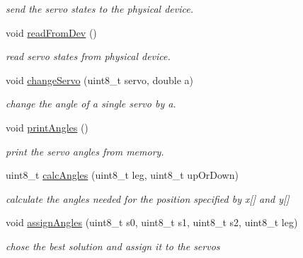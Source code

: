 \begin{DoxyCompactItemize}
\begin{DoxyCompactList}\small\item\em send the servo states to the physical device. \item\end{DoxyCompactList}\item 
\hypertarget{class_c_q_ped_aac05763481aaef8e97cb1491bfca4334}{
void \hyperlink{class_c_q_ped_aac05763481aaef8e97cb1491bfca4334}{readFromDev} ()}
\label{class_c_q_ped_aac05763481aaef8e97cb1491bfca4334}

\begin{DoxyCompactList}\small\item\em read servo states from physical device. \item\end{DoxyCompactList}\item 
\hypertarget{class_c_q_ped_a1164619231de4b603e81a9667dd70426}{
void \hyperlink{class_c_q_ped_a1164619231de4b603e81a9667dd70426}{changeServo} (uint8\_\-t servo, double a)}
\label{class_c_q_ped_a1164619231de4b603e81a9667dd70426}

\begin{DoxyCompactList}\small\item\em change the angle of a single servo by a. \item\end{DoxyCompactList}\item 
\hypertarget{class_c_q_ped_a5692f3e1bd4f098dd56dcf2501bebca2}{
void \hyperlink{class_c_q_ped_a5692f3e1bd4f098dd56dcf2501bebca2}{printAngles} ()}
\label{class_c_q_ped_a5692f3e1bd4f098dd56dcf2501bebca2}

\begin{DoxyCompactList}\small\item\em print the servo angles from memory. \item\end{DoxyCompactList}\item 
\hypertarget{class_c_q_ped_aff6fe55cbb33d0f31099ea44a09caed1}{
uint8\_\-t \hyperlink{class_c_q_ped_aff6fe55cbb33d0f31099ea44a09caed1}{calcAngles} (uint8\_\-t leg, uint8\_\-t upOrDown)}
\label{class_c_q_ped_aff6fe55cbb33d0f31099ea44a09caed1}

\begin{DoxyCompactList}\small\item\em calculate the angles needed for the position specified by x\mbox{[}\mbox{]} and y\mbox{[}\mbox{]} \item\end{DoxyCompactList}\item 
\hypertarget{class_c_q_ped_a9f8c4839afeb621c94400a1fceae981c}{
void \hyperlink{class_c_q_ped_a9f8c4839afeb621c94400a1fceae981c}{assignAngles} (uint8\_\-t s0, uint8\_\-t s1, uint8\_\-t s2, uint8\_\-t leg)}
\label{class_c_q_ped_a9f8c4839afeb621c94400a1fceae981c}

\begin{DoxyCompactList}\small\item\em chose the best solution and assign it to the servos \item\end{DoxyCompactList}\end{DoxyCompactItemize}
